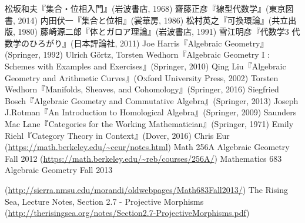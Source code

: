 \documentclass[10pt]{jsarticle}%
\begin{document}
\begin{thebibliography}{1}%
   松坂和夫『集合・位相入門』(岩波書店, 1968)
   齋藤正彦『線型代数学』(東京図書, 2014)
   内田伏一『集合と位相』(裳華房, 1986)
   松村英之『可換環論』(共立出版, 1980)
   藤崎源二郎『体とガロア理論』(岩波書店, 1991)
   雪江明彦『代数学3 代数学のひろがり』(日本評論社, 2011)
   Joe Harris『Algebraic Geometry』(Springer, 1992)
   Ulrich G\"{o}rtz, Torsten Wedhorn『Algebraic Geometry I : Schemes  with Examples and Exercises』(Springer, 2010)
   Qing Liu『Algebraic Geometry and Arithmetic Curves』(Oxford University Press, 2002)
   Torsten Wedhorn『Manifolds, Sheaves, and Cohomology』(Springer, 2016)
   Siegfried Bosch『Algebraic Geometry and Commutative Algebra』(Springer, 2013)
   Joseph J.Rotman『An Introduction to Homological Algebra』(Springer, 2009)
   Saunders Mac Lane『Categories for the Working Mathematician』(Springer, 1971)
   Emily Riehl『Category Theory in Context』(Dover, 2016)
   Chris Eur (\url{https://math.berkeley.edu/~ceur/notes.html})
   Math 256A Algebraic Geometry Fall 2012 (\url{https://math.berkeley.edu/~reb/courses/256A/})
   Mathematics 683 Algebraic Geometry Fall 2013


    (\url{http://sierra.nmsu.edu/morandi/oldwebpages/Math683Fall2013/})
   The Rising Sea, Lecture Notes, Section 2.7 - Projective Morphisms (\url{http://therisingsea.org/notes/Section2.7-ProjectiveMorphisms.pdf})

\end{thebibliography}
\end{document}
